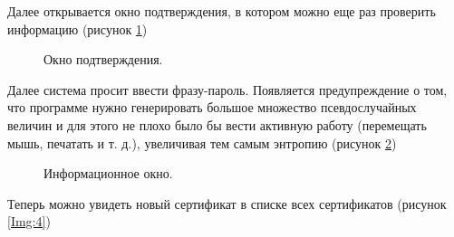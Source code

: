 \documentclass[10pt,a4paper]{report}
\begin{document}
	Далее открывается окно подтверждения, в котором можно еще раз проверить информацию (рисунок \ref{Img:2})
	
		\begin{figure}[h]	
			\caption{Окно подтверждения.}
			\label{Img:2}
		\end{figure}
	
	Далее система просит ввести фразу-пароль. Появляется предупреждение о том, что программе нужно генерировать большое множество псевдослучайных величин и для этого не плохо было бы вести активную работу (перемещать мышь, печатать и т. д.), увеличивая тем самым энтропию (рисунок \ref{Img:3})
	
		\begin{figure}[h]	
			\caption{Информационное окно.}
			\label{Img:3}
		\end{figure}
		
	Теперь можно увидеть новый сертификат в списке всех сертификатов (рисунок \ref{Img:4})
	
\end{document}
